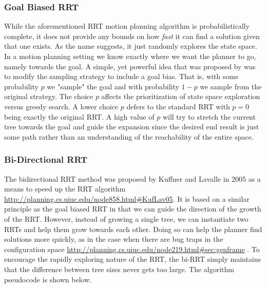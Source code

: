 \subsubsection{Goal Biased RRT} \label{planning:goal-bias}
While the aforementioned RRT motion planning algorithm is probabilistically complete, it does not provide any bounds on how \emph{fast} it can find a solution given that one exists. As the name suggests, it just randomly explores the state space. In a motion planning setting we know exactly where we want the planner to go, namely towards the goal. A simple, yet powerful idea that was proposed by  was to modify the sampling strategy to include a goal bias. That is, with some probability $p$ we "sample" the goal and with probability $1-p$ we sample from the original strategy. The choice $p$ affects the prioritization of state space exploration versus greedy search. A lower choice $p$ defers to the standard RRT with $p=0$ being exactly the original RRT. A high value of $p$ will try to stretch the current tree towards the goal and guide the expansion since the desired end result is just some path rather than an understanding of the reachability of the entire space.

\subsubsection{Bi-Directional RRT} \label{planning:birrt}
The bidirectional RRT method was proposed by  Kuffner and Lavalle in 2005 as a means to speed up the RRT algorithm \url{http://planning.cs.uiuc.edu/node858.html#KufLav05}. It is based on a similar principle as the goal biased RRT in that we can guide the direction of the growth of the RRT. However, instead of growing a single tree, we can instantiate two RRTs and help them grow towards each other. Doing so can help the planner find solutions more quickly, as in the case when there are bug traps in the configuration space \url{http://planning.cs.uiuc.edu/node219.html#sec:genframe} . To encourage the rapidly exploring nature of the RRT, the bi-RRT simply maintains that the difference between tree sizes never gets too large. The algorithm pseudocode is shown below.

